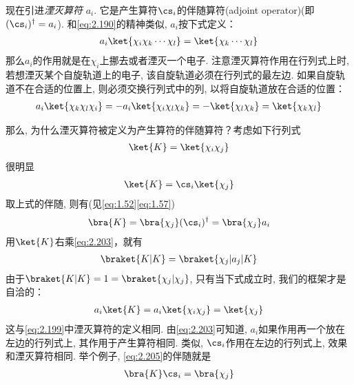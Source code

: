 现在引进\emph{湮灭算符} $a_i$. 
它是产生算符$\cs_i$的伴随算符(adjoint operator)(即$(\cs_i)^\dagger = a_i$). 
和\autoref{eq:2.190}的精神类似, 
$a_i$按下式定义：
\begin{align}\label{eq:2.199}
a_i \ket{\chi_i\chi_k\cdots\chi_l} = \ket{\chi_k\cdots\chi_l}
\end{align}
那么$a_i$的作用就是在$\chi_i$上挪去或者湮灭一个电子. 
注意湮灭算符作用在行列式上时, 
若想湮灭某个自旋轨道上的电子, 
该自旋轨道必须在行列式的最左边. 
如果自旋轨道不在合适的位置上, 
则必须交换行列式中的列, 
以将自旋轨道放在合适的位置：
\begin{align}
a_i \ket{\chi_k\chi_l\chi_i} = -a_i \ket{\chi_i\chi_l\chi_k} = -\ket{\chi_l\chi_k} = \ket{\chi_k\chi_l}
\end{align} 

那么, 
为什么湮灭算符被定义为产生算符的伴随算符？考虑如下行列式
\begin{align}
\ket{K} = \ket{\chi_i\chi_j}
\end{align}
很明显
\begin{align}
\ket{K} = \cs_i \ket{\chi_j} 
\end{align}
取上式的伴随, 
则有(见\autoref{eq:1.52}\autoref{eq:1.57})
\begin{align}\label{eq:2.203}
\bra{K} = \bra{\chi_j}(\cs_i)^\dagger = \bra{\chi_j}a_i
\end{align}
用$\ket{K}$右乘\autoref{eq:2.203}，就有
\begin{align}
\braket{K|K} = \braket{\chi_j|a_j|K}
\end{align}
由于$\braket{K|K} = 1 = \braket{\chi_j|\chi_j}$, 
只有当下式成立时, 
我们的框架才是自洽的：
\begin{align}\label{eq:2.205}
a_i\ket{K} = a_i\ket{\chi_i\chi_j} = \ket{\chi_j}
\end{align} 
这与\autoref{eq:2.199}中湮灭算符的定义相同. 
由\autoref{eq:2.203}可知道, 
$a_i$如果作用再一个放在左边的行列式上, 
其作用于产生算符相同. 
类似, 
$\cs_i$作用在左边的行列式上, 
效果和湮灭算符相同. 
举个例子, 
\autoref{eq:2.205}的伴随就是
\begin{align}
\bra{K}\cs_i = \bra{\chi_j}
\end{align}

